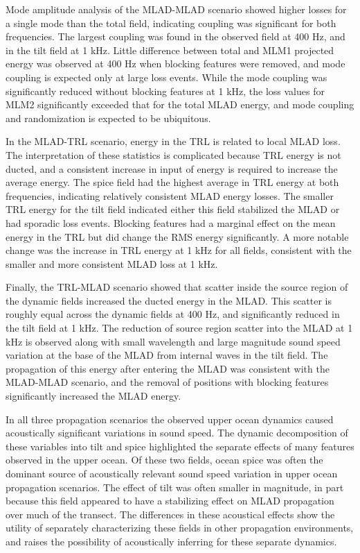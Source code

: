 \documentclass[preprint,NumberedRefs]{JASA}
\begin{document}
Mode amplitude analysis of the MLAD-MLAD scenario showed higher losses for a single mode than the total field, indicating coupling was significant for both frequencies. The largest coupling was found in the observed field at 400 Hz, and in the tilt field at 1 kHz. Little difference between total and MLM1 projected energy was observed at 400 Hz when blocking features were removed, and mode coupling is expected only at large loss events. While the mode coupling was significantly reduced without blocking features at 1 kHz, the loss values for MLM2 significantly exceeded that for the total MLAD energy, and mode coupling and randomization is expected to be ubiquitous.

In the MLAD-TRL scenario, energy in the TRL is related to local MLAD loss. The interpretation of these statistics is complicated because TRL energy is not ducted, and a consistent increase in input of energy is required to increase the average energy. The spice field had the highest average in TRL energy at both frequencies, indicating relatively consistent MLAD energy losses. The smaller TRL energy for the tilt field indicated either this field stabilized the MLAD or had sporadic loss events. Blocking features had a marginal effect on the mean energy in the TRL but did change the RMS energy significantly. A more notable change was the increase in TRL energy at 1 kHz for all fields, consistent with the smaller and more consistent MLAD loss at 1 kHz.

Finally, the TRL-MLAD scenario showed that scatter inside the source region of the dynamic fields increased the ducted energy in the MLAD. This scatter is roughly equal across the dynamic fields at 400 Hz, and significantly reduced in the tilt field at 1 kHz. The reduction of source region scatter into the MLAD at 1 kHz is observed along with small wavelength and large magnitude sound speed variation at the base of the MLAD from internal waves in the tilt field. The propagation of this energy after entering the MLAD was consistent with the MLAD-MLAD scenario, and the removal of positions with blocking features significantly increased the MLAD energy.

In all three propagation scenarios the observed upper ocean dynamics caused acoustically significant variations in sound speed. The dynamic decomposition of these variables into tilt and spice highlighted the separate effects of many features observed in the upper ocean. Of these two fields, ocean spice was often the dominant source of acoustically relevant sound speed variation in upper ocean propagation scenarios. The effect of tilt was often smaller in magnitude, in part because this field appeared to have a stabilizing effect on MLAD propagation over much of the transect. The differences in these acoustical effects show the utility of separately characterizing these fields in other propagation environments, and raises the possibility of acoustically inferring for these separate dynamics.



\end{document}
